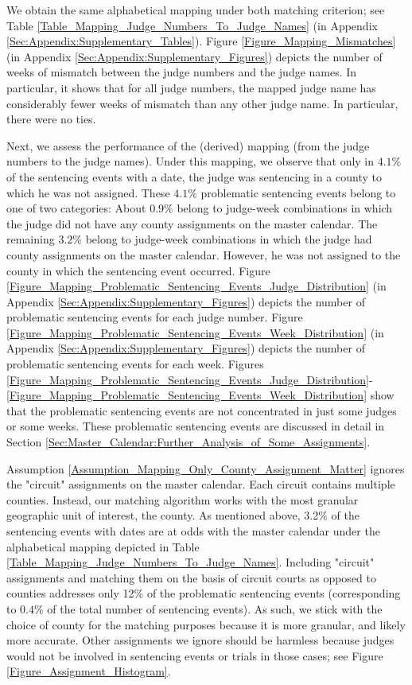 \documentclass[11pt, oneside]{article}   	%
\theoremstyle{ModifiedStyle}
\begin{document}
We obtain the same alphabetical mapping under both matching criterion; see Table \ref{Table_Mapping_Judge_Numbers_To_Judge_Names} (in Appendix \ref{Sec:Appendix:Supplementary_Tables}). Figure \ref{Figure_Mapping_Mismatches} (in Appendix \ref{Sec:Appendix:Supplementary_Figures}) depicts the number of weeks of mismatch between the judge numbers and the judge names. In particular, it shows that for all judge numbers, the mapped judge name has considerably fewer weeks of mismatch than any other judge name. In particular, there were no ties.

Next, we assess the performance of the (derived) mapping (from the judge numbers to the judge names). Under this mapping, we observe that only in $4.1\%$ of the sentencing events with a date, the judge was sentencing in a county to which he was not assigned. These $4.1\%$ problematic sentencing events belong to one of two categories: About $0.9\%$ belong to judge-week combinations in which the judge did not have any county assignments on the master calendar. The remaining $3.2\%$ belong to judge-week combinations in which the judge had county assignments on the master calendar. However, he was not assigned to the county in which the sentencing event occurred. Figure \ref{Figure_Mapping_Problematic_Sentencing_Events_Judge_Distribution} (in Appendix \ref{Sec:Appendix:Supplementary_Figures}) depicts the number of problematic sentencing events for each judge number. Figure \ref{Figure_Mapping_Problematic_Sentencing_Events_Week_Distribution} (in Appendix \ref{Sec:Appendix:Supplementary_Figures}) depicts the number of problematic sentencing events for each week. Figures \ref{Figure_Mapping_Problematic_Sentencing_Events_Judge_Distribution}-\ref{Figure_Mapping_Problematic_Sentencing_Events_Week_Distribution} show that the problematic sentencing events are not concentrated in just some judges or some weeks. These problematic sentencing events are discussed in detail in Section \ref{Sec:Master_Calendar:Further_Analysis_of_Some_Assignments}.

Assumption \ref{Assumption_Mapping_Only_County_Assignment_Matter} ignores the "circuit" assignments on the master calendar. Each circuit contains multiple counties. Instead, our matching algorithm works with the most granular geographic unit of interest, the county. As mentioned above, 3.2\% of the sentencing events with dates are at odds with the master calendar under the alphabetical mapping depicted in Table \ref{Table_Mapping_Judge_Numbers_To_Judge_Names}. Including "circuit" assignments and matching them on the basis of circuit courts as opposed to counties addresses only 12\% of the problematic sentencing events (corresponding to $0.4\%$ of the total number of sentencing events). As such, we stick with the choice of county for the matching purposes because it is more granular, and likely more accurate. Other assignments we ignore should be harmless because judges would not be involved in sentencing events or trials in those cases; see Figure  \ref{Figure_Assignment_Histogram}.
\end{document}
